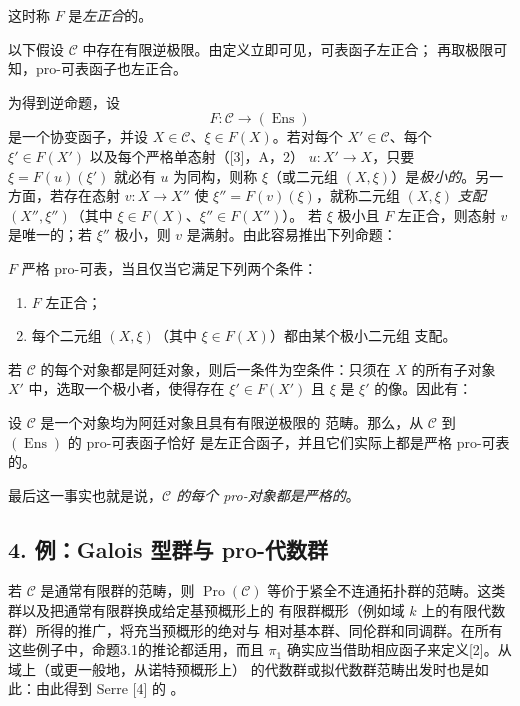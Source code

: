 这时称 $F$ 是\emph{左正合}的。

以下假设 $\mathcal C$ 中存在有限逆极限。由定义立即可见，可表函子左正合；
再取极限可知，pro-可表函子也左正合。

为得到逆命题，设
\[
  F:\mathcal C\longrightarrow(\operatorname{Ens})
\]
是一个协变函子，并设 $X\in\mathcal C$、$\xi\in F(X)$。若对每个
$X'\in\mathcal C$、每个 $\xi'\in F(X')$ 以及每个严格单态射（[3]，A，2）
$u:X'\longrightarrow X$，只要 $\xi=F(u)(\xi')$ 就必有 $u$ 为同构，则称
$\xi$（或二元组 $(X,\xi)$）是\emph{极小的}。另一方面，若存在态射
$v:X\longrightarrow X''$ 使 $\xi''=F(v)(\xi)$，就称二元组 $(X,\xi)$
\emph{支配} $(X'',\xi'')$（其中 $\xi\in F(X)$、$\xi''\in F(X'')$）。
若 $\xi$ 极小且 $F$ 左正合，则态射 $v$ 是唯一的；若 $\xi''$ 极小，则
$v$ 是满射。由此容易推出下列命题：

 $F$ 严格 pro-可表，当且仅当它满足下列两个条件：
\begin{enumerate}
\item[(i)] $F$ 左正合；
\item[(ii)] 每个二元组 $(X,\xi)$（其中 $\xi\in F(X)$）都由某个极小二元组
支配。
\end{enumerate}

若 $\mathcal C$ 的每个对象都是阿廷对象，则后一条件为空条件：只须在 $X$
的所有子对象 $X'$ 中，选取一个极小者，使得存在 $\xi'\in F(X')$ 且
$\xi$ 是 $\xi'$ 的像。因此有：

 设 $\mathcal C$ 是一个对象均为阿廷对象且具有有限逆极限的
范畴。那么，从 $\mathcal C$ 到 $(\operatorname{Ens})$ 的 pro-可表函子恰好
是左正合函子，并且它们实际上都是严格 pro-可表的。

最后这一事实也就是说，\emph{$\mathcal C$ 的每个 pro-对象都是严格的}。

\subsection*{4. 例：Galois 型群与 pro-代数群}

若 $\mathcal C$ 是通常有限群的范畴，则 $\operatorname{Pro}(\mathcal C)$
等价于紧全不连通拓扑群的范畴。这类群以及把通常有限群换成给定基预概形上的
有限群概形（例如域 $k$ 上的有限代数群）所得的推广，将充当预概形的绝对与
相对基本群、同伦群和同调群。在所有这些例子中，命题3.1的推论都适用，而且
$\pi_1$ 确实应当借助相应函子来定义[2]。从域上（或更一般地，从诺特预概形上）
的代数群或拟代数群范畴出发时也是如此：由此得到 Serre [4] 的
。

